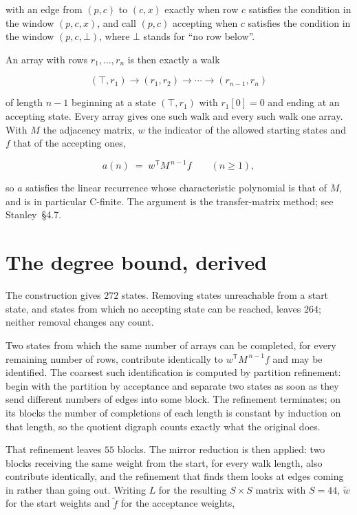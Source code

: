 \documentclass[11pt]{article}
\theoremstyle{definition}
\begin{document}
with an edge from $(p,c)$ to $(c,x)$ exactly when row $c$ satisfies the condition in the window $(p,c,x)$, and call $(p,c)$ accepting when $c$ satisfies the condition in the window $(p,c,\bot)$, where $\bot$ stands for ``no row below''.

An array with rows $r_1,\dots,r_n$ is then exactly a walk

\[(\top,r_1) \to (r_1,r_2) \to \cdots \to (r_{n-1},r_n)\]

of length $n-1$ beginning at a state $(\top,r_1)$ with $r_1[0]=0$ and ending at an accepting state. Every array gives one such walk and every such walk one array. With $M$ the adjacency matrix, $w$ the indicator of the allowed starting states and $f$ that of the accepting ones,

\[a(n) \;=\; w^{\mathsf T} M^{\,n-1} f \qquad (n \ge 1),\]

so $a$ satisfies the linear recurrence whose characteristic polynomial is that of $M$, and is in particular C-finite. The argument is the transfer-matrix method; see Stanley~\S4.7.

\section{The degree bound, derived}

The construction gives $272$ states. Removing states unreachable from a start state, and states from which no accepting state can be reached, leaves $264$; neither removal changes any count.

Two states from which the same number of arrays can be completed, for every remaining number of rows, contribute identically to $w^{\mathsf T}M^{\,n-1}f$ and may be identified. The coarsest such identification is computed by partition refinement: begin with the partition by acceptance and separate two states as soon as they send different numbers of edges into some block. The refinement terminates; on its blocks the number of completions of each length is constant by induction on that length, so the quotient digraph counts exactly what the original does.

That refinement leaves $55$ blocks. The mirror reduction is then applied: two blocks receiving the same weight from the start, for every walk length, also contribute identically, and the refinement that finds them looks at edges coming in rather than going out. Writing $L$ for the resulting $S \times S$ matrix with $S = 44$, $\tilde w$ for the start weights and $\tilde f$ for the acceptance weights,
\end{document}
